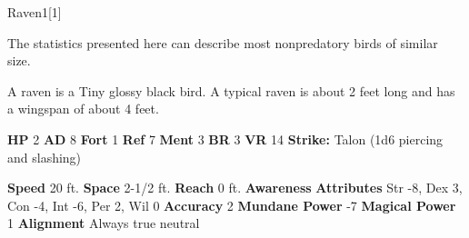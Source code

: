   
  \begin{monsection}{Raven}{1}[1]
    \vspace{-1em}\vspace{-1em}
    \vspace{0em}

    
      The statistics presented here can describe most nonpredatory birds of similar size.
    
        A raven is a Tiny glossy black bird.
        A typical raven is about 2 feet long and has a wingspan of about 4 feet.
      

    \begin{spellcontent}
      \begin{spelltargetinginfo}
        \pari \textbf{HP} 2 \monsep
          \textbf{AD} 8 \monsep
          \textbf{Fort} 1 \monsep
          \textbf{Ref} 7 \monsep
          \textbf{Ment} 3
        \pari \textbf{BR} 3 \monsep
        \textbf{VR} 14
        \pari \textbf{Strike:}
            Talon  (1d6 piercing and slashing)
      \end{spelltargetinginfo}
    \end{spellcontent}
    \begin{monsterfooter}
      \pari \textbf{Speed} 20 ft. \monsep
        \textbf{Space} 2-1/2 ft. \monsep
        \textbf{Reach} 0 ft.
      \pari \textbf{Awareness} 
      \pari \textbf{Attributes}
        Str -8, Dex 3,
        Con -4, Int -6,
        Per 2, Wil 0
      \pari \textbf{Accuracy} 2 \monsep
        \textbf{Mundane Power} -7 \monsep
      \textbf{Magical Power} 1
      \pari \textbf{Alignment} Always true neutral
    \end{monsterfooter}
  \end{monsection}
  
